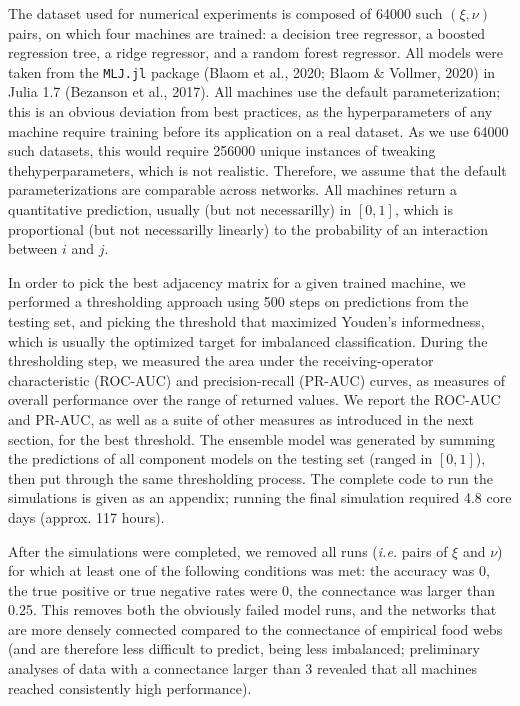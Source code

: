 \documentclass[11pt]{article}
\begin{document}
The dataset used for numerical experiments is composed of 64000 such
\((\xi, \nu)\) pairs, on which four machines are trained: a decision
tree regressor, a boosted regression tree, a ridge regressor, and a
random forest regressor. All models were taken from the \texttt{MLJ.jl}
package (Blaom et al., 2020; Blaom \& Vollmer, 2020) in Julia 1.7
(Bezanson et al., 2017). All machines use the default parameterization;
this is an obvious deviation from best practices, as the hyperparameters
of any machine require training before its application on a real
dataset. As we use 64000 such datasets, this would require 256000 unique
instances of tweaking thehyperparameters, which is not realistic.
Therefore, we assume that the default parameterizations are comparable
across networks. All machines return a quantitative prediction, usually
(but not necessarilly) in \([0,1]\), which is proportional (but not
necessarilly linearly) to the probability of an interaction between
\(i\) and \(j\).

In order to pick the best adjacency matrix for a given trained machine,
we performed a thresholding approach using 500 steps on predictions from
the testing set, and picking the threshold that maximized Youden's
informedness, which is usually the optimized target for imbalanced
classification. During the thresholding step, we measured the area under
the receiving-operator characteristic (ROC-AUC) and precision-recall
(PR-AUC) curves, as measures of overall performance over the range of
returned values. We report the ROC-AUC and PR-AUC, as well as a suite of
other measures as introduced in the next section, for the best
threshold. The ensemble model was generated by summing the predictions
of all component models on the testing set (ranged in \([0,1]\)), then
put through the same thresholding process. The complete code to run the
simulations is given as an appendix; running the final simulation
required 4.8 core days (approx. 117 hours).

After the simulations were completed, we removed all runs (\emph{i.e.}
pairs of \(\xi\) and \(\nu\)) for which at least one of the following
conditions was met: the accuracy was 0, the true positive or true
negative rates were 0, the connectance was larger than 0.25. This
removes both the obviously failed model runs, and the networks that are
more densely connected compared to the connectance of empirical food
webs (and are therefore less difficult to predict, being less
imbalanced; preliminary analyses of data with a connectance larger than
3 revealed that all machines reached consistently high performance).
\end{document}
